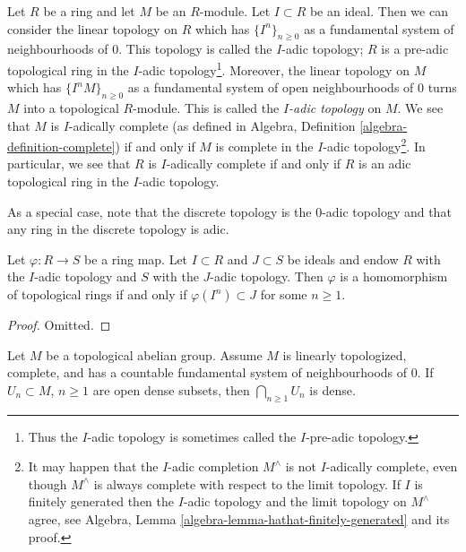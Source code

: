 \noindent
Let $R$ be a ring and let $M$ be an $R$-module. Let $I \subset R$ be
an ideal. Then we can consider the linear topology on $R$ which has
$\{I^n\}_{n \geq 0}$ as a fundamental system of neighbourhoods of $0$.
This topology is called the $I$-adic topology; $R$ is a pre-adic
topological ring in the $I$-adic topology\footnote{Thus the $I$-adic
topology is sometimes called the $I$-pre-adic topology.}. Moreover, the
linear topology
on $M$ which has $\{I^nM\}_{n \geq 0}$ as a fundamental system of open
neighbourhoods of $0$ turns $M$ into a topological $R$-module.
This is called the {\it $I$-adic topology} on $M$. We see that
$M$ is $I$-adically complete (as defined in
Algebra, Definition \ref{algebra-definition-complete})
if and only if $M$ is complete in the $I$-adic topology\footnote{
It may happen that the $I$-adic completion $M^\wedge$
is not $I$-adically complete, even though $M^\wedge$
is always complete with respect to the limit topology. If $I$ is finitely
generated then the $I$-adic topology and the limit topology on $M^\wedge$
agree, see Algebra, Lemma \ref{algebra-lemma-hathat-finitely-generated} and
its proof.}.
In particular, we see that $R$ is $I$-adically complete if and
only if $R$ is an adic topological ring in the $I$-adic topology.

\medskip\noindent
As a special case, note that the discrete topology is the $0$-adic
topology and that any ring in the discrete topology is adic.

\begin{lemma}
\label{lemma-continuous}
Let $\varphi : R \to S$ be a ring map.
Let $I \subset R$ and $J \subset S$ be ideals
and endow $R$ with the $I$-adic topology and $S$ with the $J$-adic
topology. Then $\varphi$ is a homomorphism of topological rings
if and only if $\varphi(I^n) \subset J$ for some $n \geq 1$.
\end{lemma}

\begin{proof}
Omitted.
\end{proof}

\begin{lemma}
\label{lemma-baire-category-complete-module}
Let $M$ be a topological abelian group. Assume $M$ is linearly
topologized, complete, and has a countable fundamental system of
neighbourhoods of $0$. If $U_n \subset M$, $n \geq 1$
are open dense subsets, then $\bigcap_{n \geq 1} U_n$ is dense.
\end{lemma}

